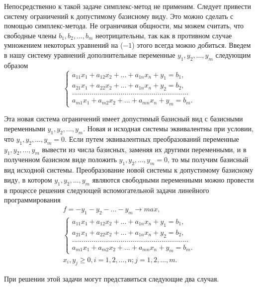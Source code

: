 Непосредственно к такой задаче симплекс-метод не применим. Следует привести систему ограничений к допустимому базисному виду. Это можно сделать с помощью симплекс-метода. Не ограничивая общности, мы можем считать, что свободные члены $b_{1}, b_{2},..., b_{m}$ неотрицательны, так как в противном  случае умножением  некоторых уравнений на ($-1$) этого всегда можно добиться. Введем в нашу систему уравнений дополнительные переменные $y_{1}, y_{2},..., y_{m}$ следующим образом
$$\begin{cases}
a_{1 1}x_{1}+a_{1 2}x_{2}+...+a_{1 n}x_{n}+y_{1}=b_{1},\\
a_{2 1}x_{1}+a_{2 2}x_{2}+...+a_{1 n}x_{n}+y_{2}=b_{2},\\
............................................................\\
a_{m 1}x_{1}+a_{m 2}x_{2}+...+a_{m n}x_{n}+y_{m}=b_{m}.
\end{cases}$$

Эта новая система ограничений имеет допустимый базисный вид с базисными переменными $y_{1}, y_{2},..., y_{m}$. Новая и исходная системы эквивалентны при условии, что $y_{1},y_{2},...,y_{m}=0$. Если путем эквивалентных преобразований переменные $y_{1}, y_{2},..., y_{m}$ вывести из числа базисных, заменяя их другими переменными, и в полученном базисном виде положить $y_{1},y_{2},...,y_{m}=0$, то мы получим базисный вид исходной системы. Преобразование новой системы к допустимому базисному виду, в котором $y_{1},y_{2},...,y_{m}$ являются свободными переменными можно провести в процессе решения следующей вспомогательной задачи линейного программирования\\

\begin{gather*}
f=-y_{1}-y_{2}-...-y_{m}\rightarrow max,\\
\begin{cases}
a_{1 1}x_{1}+a_{1 2}x_{2}+...+a_{1 n}x_{n}+y_{1}=b_{1},\\
a_{2 1}x_{1}+a_{2 2}x_{2}+...+a_{1 n}x_{n}+y_{2}=b_{2},\\
............................................................\\
a_{m 1}x_{1}+a_{m 2}x_{2}+...+a_{m n}x_{n}+y_{m}=b_{m}.
\end{cases}\\
x_{i},y_{j}\geq0, i=1,2,...,n; j=1,2,...,m.
\end{gather*}

При решении этой задачи могут представиться следующие два случая.

